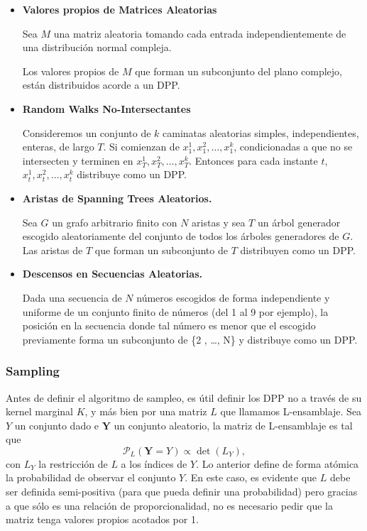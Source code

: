 \begin{itemize}
    \item \textbf{Valores propios de Matrices Aleatorias} \cite{MEHTA1960420}\cite{doi:10.1063/1.1704292}
    
    Sea $M$ una matriz aleatoria tomando cada entrada independientemente de una distribución normal compleja. 

    Los valores propios de $M$ que forman un subconjunto del plano complejo, están distribuidos acorde a un DPP. 
    
    \item \textbf{Random Walks No-Intersectantes} \cite{Johansson_2004} 
    
    Consideremos un conjunto de $k$ caminatas aleatorias simples, independientes, enteras, de largo $T$. Si comienzan de  $x_{1}^{1} , x_{1}^{2} , \dots , x_{1}^{k}$, condicionadas a que no se intersecten y terminen en $x_{T}^{1} , x_{T}^{2} , \dots , x_{T}^{k}$. Entonces para cada instante $t$, $x_{t}^{1} , x_{t}^{2} , \dots , x_{t}^{k}$ distribuye como un DPP.
    
    \item \textbf{Aristas de Spanning Trees Aleatorios. }\cite{https://doi.org/10.48550/arxiv.math/0404048}
    
    Sea $G$ un grafo arbitrario finito con $N$ aristas y sea $T$ un árbol generador escogido aleatoriamente del conjunto de todos los árboles generadores de $G$. Las aristas de $T$ que forman un subconjunto de $T$ distribuyen como un DPP.  
    
    \item \textbf{Descensos en Secuencias Aleatorias. } \cite{https://doi.org/10.48550/arxiv.0904.3740}

    Dada una secuencia de $N$ números escogidos de forma independiente y uniforme de un conjunto finito de números (del 1 al 9 por ejemplo), la posición en la secuencia donde tal número es menor que el escogido previamente forma un subconjunto de \{2 , \dots , N\} y distribuye como un DPP.
    
\end{itemize}

\subsubsection{Sampling}

Antes de definir el algoritmo de sampleo, es útil definir los DPP no a través de su kernel marginal $K$, y más bien por una matriz $L$ que llamamos L-ensamblaje. Sea $Y$ un conjunto dado e $\textbf{Y}$ un conjunto aleatorio, la matriz de L-ensamblaje es tal que 
\[ \mathcal{P}_{L}(\textbf{Y} = Y) \propto \det(L_Y) ,  \]
con $L_Y$ la restricción de $L$ a los índices de $Y$. Lo anterior define de forma atómica la probabilidad de observar el conjunto $Y$. En este caso, es evidente que $L$ debe ser definida semi-positiva (para que pueda definir una probabilidad) pero gracias a que sólo es una relación de proporcionalidad, no es necesario pedir que la matriz tenga valores propios acotados por 1. 


